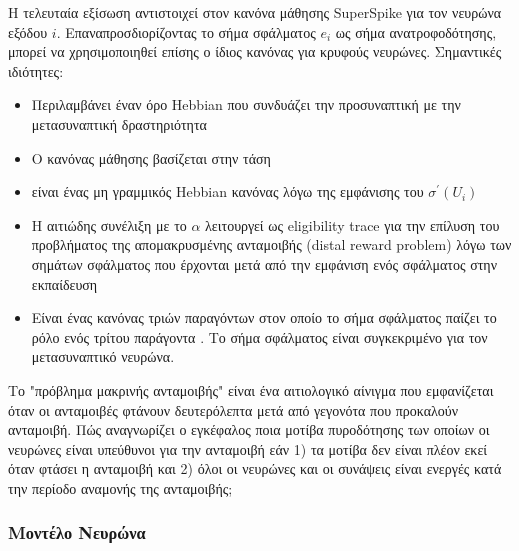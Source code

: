 \documentclass[12pt]{report}
\begin{document}
Η τελευταία εξίσωση αντιστοιχεί στον κανόνα μάθησης \textlatin{SuperSpike} για τον νευρώνα εξόδου $i$.
Επαναπροσδιορίζοντας το σήμα σφάλματος $e_{i}$ ως σήμα ανατροφοδότησης, μπορεί να χρησιμοποιηθεί επίσης ο ίδιος κανόνας για κρυφούς νευρώνες. Σημαντικές ιδιότητες:
\begin{itemize}
  \item Περιλαμβάνει έναν όρο \textlatin{Hebbian}  που συνδυάζει την προσυναπτική με την μετασυναπτική δραστηριότητα
  \item Ο κανόνας μάθησης βασίζεται στην τάση
  \item είναι ένας μη γραμμικός \textlatin{Hebbian} κανόνας λόγω της εμφάνισης του $\sigma^{\prime}\left(U_{i}\right)$
  \item Η αιτιώδης συνέλιξη με το $\alpha$ λειτουργεί ως \textlatin{eligibility trace} για την επίλυση του προβλήματος της απομακρυσμένης ανταμοιβής (\textlatin{distal reward problem}) λόγω των σημάτων σφάλματος που έρχονται μετά από την εμφάνιση ενός σφάλματος στην εκπαίδευση \cite{izike2007}
  \item Είναι ένας κανόνας τριών παραγόντων στον οποίο το σήμα σφάλματος παίζει το ρόλο ενός τρίτου παράγοντα \cite{fremaux2016} . Το σήμα σφάλματος είναι συγκεκριμένο για τον μετασυναπτικό νευρώνα.
\end{itemize}

Το "πρόβλημα μακρινής ανταμοιβής" είναι ένα αιτιολογικό αίνιγμα που εμφανίζεται όταν οι ανταμοιβές φτάνουν δευτερόλεπτα μετά από γεγονότα που προκαλούν ανταμοιβή. Πώς αναγνωρίζει ο εγκέφαλος ποια μοτίβα πυροδότησης των οποίων οι νευρώνες είναι υπεύθυνοι για την ανταμοιβή εάν 1) τα μοτίβα δεν είναι πλέον εκεί όταν φτάσει η ανταμοιβή και 2) όλοι οι νευρώνες και οι συνάψεις είναι ενεργές κατά την περίοδο αναμονής της ανταμοιβής;

\subsubsection{Μοντέλο Νευρώνα}
\end{document}
